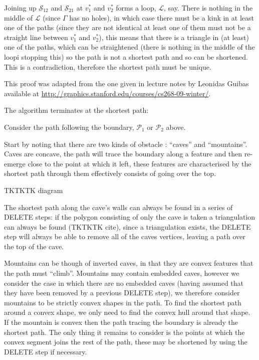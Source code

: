 Joining up $\mathcal{S}_{12}$ and $\mathcal{S}_{21}$ at $v_1^*$ and $v_2^*$ forms a loop, $\mathcal{L}$, say. There is nothing in the middle of $\mathcal{L}$ (since $\Gamma$ has no holes), in which case there must be a kink in at least one of the paths (since they are not identical at least one of them must not be a straight line between $v_1^*$ and $v_2^*$), this means that there is a triangle in (at least) one of the paths, which can be straightened (there is nothing in the middle of the loopi stopping this) so the path is not a shortest path and so can be shortened. This is a contradiction, therefore the shortest path must be unique.

This proof was adapted from the one given in lecture notes by Leonidas Guibas available at \url{http://graphics.stanford.edu/courses/cs268-09-winter/}.


The algorithm terminates at the shortest path:

Consider the path following the boundary, $\mathcal{P}_1$ or $\mathcal{P}_2$ above.

Start by noting that there are two kinds of obstacle : ``caves'' and ``mountains''. Caves are concave, the path will trace the boundary along a feature and then re-emerge close to the point at which it left, these features are characterised by the shortest path through them effectively consists of going over the top.

TKTKTK diagram

The shortest path along the cave's walls can always be found in a series of DELETE steps: if the polygon consisting of only the cave is taken a triangulation can always be found (TKTKTK cite), since a triangulation exists, the DELETE step will always be able to remove all of the caves vertices, leaving a path over the top of the cave.

Mountains can be though of inverted caves, in that they are convex features that the path must ``climb''. Mountains may contain embedded caves, however we consider the case in which there are no embedded caves (having assumed that they have been removed by a previous DELETE step), we therefore consider mountains to be strictly convex shapes in the path. To find the shortest path around a convex shape, we only need to find the convex hull around that shape. If the mountain is convex then the path tracing the boundary is already the shortest path. The only thing it remains to consider is the points at which the convex segment joins the rest of the path, these may be shortened by using the DELETE step if necessary.



